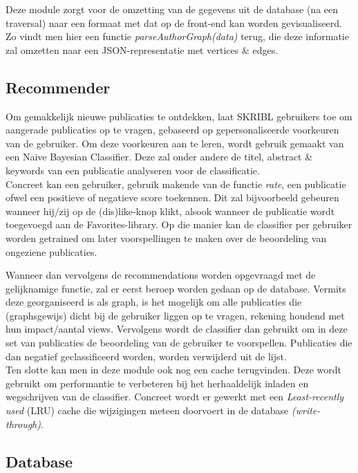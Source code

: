 \documentclass{article}
\begin{document}
Deze module zorgt voor de omzetting van de gegevens uit de database (na een traversal) naar een formaat met dat op de front-end kan worden gevisualiseerd. Zo vindt men hier een functie \textit{parseAuthorGraph(data)} terug, die deze informatie zal omzetten naar een JSON-representatie met vertices \& edges.

\subsection{Recommender}

Om gemakkelijk nieuwe publicaties te ontdekken, laat SKRIBL gebruikers toe om aangerade publicaties op te vragen, gebaseerd op gepersonaliseerde voorkeuren van de gebruiker. Om deze voorkeuren aan te leren, wordt gebruik gemaakt van een Naive Bayesian Classifier. Deze zal onder andere de titel, abstract \& keywords van een publicatie analyseren voor de classificatie. \\

Concreet kan een gebruiker, gebruik makende van de functie \textit{rate}, een publicatie ofwel een positieve of negatieve score toekennen. Dit zal bijvoorbeeld gebeuren wanneer hij/zij op de (dis)like-knop klikt, alsook wanneer de publicatie wordt toegevoegd aan de Favorites-library. Op die manier kan de classifier per gebruiker worden getrained om later voorspellingen te maken over de beoordeling van ongeziene publicaties.

Wanneer dan vervolgens de recommendations worden opgevraagd met de gelijknamige functie, zal er eerst beroep worden gedaan op de database. Vermits deze georganiseerd is als graph, is het mogelijk om alle publicaties die (graphsgewijs) dicht bij de gebruiker liggen op te vragen, rekening houdend met hun impact/aantal views. Vervolgens wordt de classifier dan gebruikt om in deze set van publicaties de beoordeling van de gebruiker te voorspellen. Publicaties die dan negatief geclassificeerd worden, worden verwijderd uit de lijst. \\

Ten slotte kan men in deze module ook nog een cache terugvinden. Deze wordt gebruikt om performantie te verbeteren bij het herhaaldelijk inladen en wegschrijven van de classifier. Concreet wordt er gewerkt met een \textit{Least-recently used} (LRU) cache die wijzigingen meteen doorvoert in de database \textit{(write-through)}.

\subsection{Database}
\end{document}
